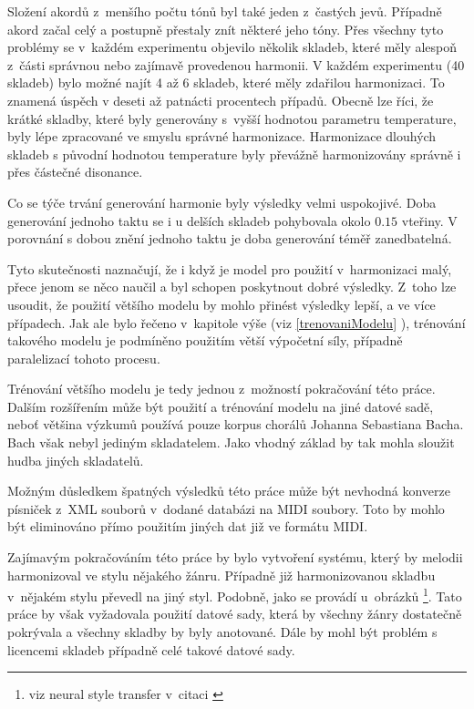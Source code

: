 Složení akordů z~menšího počtu tónů byl také jeden z~častých jevů.
Případně akord začal celý a postupně přestaly znít některé jeho tóny.
Přes všechny tyto problémy se v~každém experimentu objevilo několik skladeb,
které měly alespoň z~části správnou nebo zajímavě provedenou harmonii.
V každém experimentu (40 skladeb) bylo možné najít 4 až 6 skladeb,
které měly zdařilou harmonizaci.
To znamená úspěch v deseti až patnácti procentech případů.
Obecně lze říci, že krátké skladby, 
které byly generovány s~vyšší hodnotou parametru temperature,
byly lépe zpracované ve smyslu správné harmonizace.
Harmonizace dlouhých skladeb s původní hodnotou temperature
byly převážně harmonizovány správně i přes částečné disonance.
\par
Co se týče trvání generování harmonie byly výsledky velmi uspokojivé.
Doba generování jednoho taktu se i u delších skladeb pohybovala okolo $0.15$ vteřiny.
V porovnání s dobou znění jednoho taktu je doba generování téměř zanedbatelná.

\par
Tyto skutečnosti naznačují, že i když je model pro použití v~harmonizaci malý,
přece jenom se něco naučil a byl schopen poskytnout dobré výsledky.
Z~toho lze usoudit, že použití většího modelu by mohlo přinést výsledky lepší,
a ve více případech.
Jak ale bylo řečeno v~kapitole výše (viz \ref{trenovaniModelu} ),
trénování takového modelu je podmíněno použitím větší výpočetní síly,
případně paralelizací tohoto procesu.
\par

Trénování většího modelu je tedy jednou z~možností pokračování této práce.
Dalším rozšířením může být použití a trénování modelu na jiné datové sadě,
neboť většina výzkumů používá pouze korpus chorálů Johanna Sebastiana Bacha.
Bach však nebyl jediným skladatelem.
Jako vhodný základ by tak mohla sloužit hudba jiných skladatelů.
\par

Možným důsledkem špatných výsledků této práce
může být nevhodná konverze písniček z~XML souborů v~dodané databázi na MIDI soubory.
Toto by mohlo být eliminováno přímo použitím jiných dat již ve formátu MIDI.
\par

Zajímavým pokračováním této práce by bylo vytvoření systému, který 
by melodii harmonizoval ve stylu nějakého žánru.
Případně již harmonizovanou skladbu v~nějakém stylu 
převedl na jiný styl.
Podobně, jako se provádí u~obrázků
\footnote{viz neural style transfer v~citaci \cite{gatys2015neural}}.
Tato práce by však vyžadovala použití datové sady, 
která by všechny žánry dostatečně pokrývala 
a všechny skladby by byly anotované.
Dále by mohl být problém s licencemi skladeb případně celé takové datové sady.
\par

